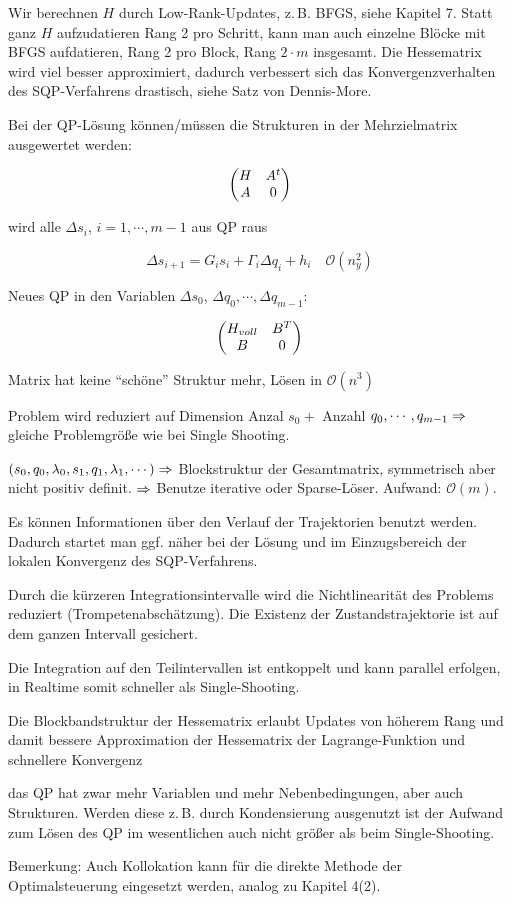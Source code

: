 Wir berechnen $H$ durch Low-Rank-Updates, z.\,B. BFGS, siehe Kapitel 7. Statt ganz $H$ aufzudatieren Rang 2 pro Schritt, kann man auch einzelne Blöcke mit BFGS aufdatieren, Rang 2 pro Block, Rang $2\cdot m$ insgesamt. Die Hessematrix wird viel besser approximiert, dadurch verbessert sich das Konvergenzverhalten des SQP-Verfahrens drastisch, siehe Satz von Dennis-More.

Bei der QP-Lösung können/müssen die Strukturen in der Mehrzielmatrix ausgewertet werden:

\[ \begin{pmatrix} H & A^t \\ A & 0 \end{pmatrix} \]


wird alle $\Delta s_i$, $i=1,\cdots,m-1$ aus QP raus

\[ \Delta s_{i+1} = G_i s_i + \Gamma_i \Delta q_i + h_i \quad \mathcal O(n_y^2) \]

Neues QP in den Variablen $\Delta s_0$, $\Delta q_0, \cdots, \Delta q_{m-1}$:

\[ \begin{pmatrix} H_{voll} & B^T \\ B & 0 \end{pmatrix} \]

Matrix hat keine "`schöne"' Struktur mehr, Lösen in $\mathcal O(n^3)$

Problem wird reduziert auf Dimension Anzal $s_0 + $ Anzahl $q_0,\cdots,q_{m-1} \Rightarrow$ gleiche Problemgröße wie bei Single Shooting.


$(s_0, q_0, \lambda_0, s_1, q_1, \lambda_1, \cdots ) \Rightarrow$ Blockstruktur der Gesamtmatrix, symmetrisch aber nicht positiv definit. $\Rightarrow$ Benutze iterative oder Sparse-Löser. Aufwand: $\mathcal O(m)$.


\bitm
\item Es können Informationen über den Verlauf der Trajektorien benutzt werden. Dadurch startet man ggf. näher bei der Lösung und im Einzugsbereich der lokalen Konvergenz des SQP-Verfahrens.
\item Durch die kürzeren Integrationsintervalle wird die Nichtlinearität des Problems reduziert (Trompetenabschätzung). Die Existenz der Zustandstrajektorie ist auf dem ganzen Intervall gesichert.
\item Die Integration auf den Teilintervallen ist entkoppelt und kann parallel erfolgen, in Realtime somit schneller als Single-Shooting.
\item Die Blockbandstruktur der Hessematrix erlaubt Updates von höherem Rang und damit bessere Approximation der Hessematrix der Lagrange-Funktion und schnellere Konvergenz
\item das QP hat zwar mehr Variablen und mehr Nebenbedingungen, aber auch Strukturen. Werden diese z.\,B. durch Kondensierung ausgenutzt ist der Aufwand zum Lösen des QP im wesentlichen auch nicht größer als beim Single-Shooting.
\eitm

Bemerkung: Auch Kollokation kann für die direkte Methode der Optimalsteuerung eingesetzt werden, analog zu Kapitel 4(2).





















